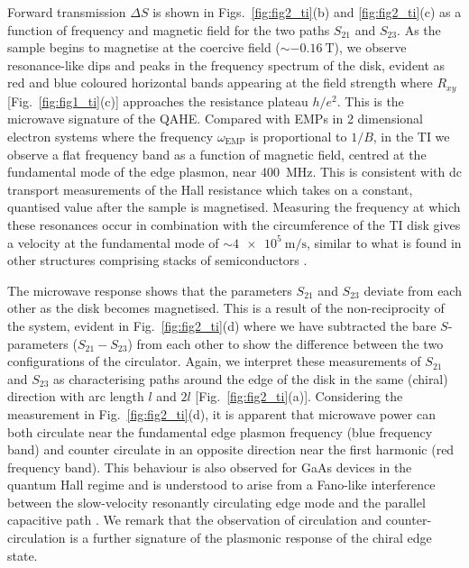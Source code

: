 Forward transmission $\Delta S$ is shown in Figs.~\ref{fig:fig2_ti}(b) and \ref{fig:fig2_ti}(c) as a function of frequency and magnetic field for the two paths $S_{21}$ and $S_{23}$. As the sample begins to magnetise at the coercive field ($\sim \SI{-0.16}{\tesla}$), we observe resonance-like dips and peaks in the frequency spectrum of the disk, evident as red and blue coloured horizontal bands appearing at the field strength where $R_{xy}$ [Fig.~\ref{fig:fig1_ti}(c)] approaches the resistance plateau $h/e^2$. This is the microwave signature of the QAHE. Compared with EMPs in 2 dimensional electron systems \cite{mahoney2016chip} where the frequency $\omega_{\mathrm{EMP}}$ is proportional to $1/B$, in the TI we observe a flat frequency band as a function of magnetic field, centred at  the fundamental mode of the edge plasmon, near \SI{400}{\mega\hertz}. This is consistent with dc transport measurements of the Hall resistance which takes on a constant, quantised value after the sample is magnetised. Measuring the frequency at which these resonances occur in combination with the circumference of the TI disk gives a velocity at the fundamental mode of $\sim \SI{4e5}{\meter\per\second}$, similar to what is found in other structures comprising stacks of semiconductors \cite{kamata2010voltage, kumada2011edge, mahoney2016chip}.

The microwave response shows that  the parameters $S_{21}$ and $S_{23}$ deviate from each other as the disk becomes magnetised. This is a result of the non-reciprocity of the system, evident in Fig.~\ref{fig:fig2_ti}(d) where we have subtracted the bare $S$-parameters ($S_{21} - S_{23}$) from each other to show the difference between the two configurations of the circulator. Again, we interpret these measurements of $S_{21}$ and $S_{23}$ as characterising paths around the edge of the disk in the same (chiral) direction with arc length $l$ and $2l$ [Fig.~\ref{fig:fig2_ti}(a)]. Considering the measurement in Fig.~\ref{fig:fig2_ti}(d), it is apparent that microwave power can both circulate near the fundamental edge plasmon frequency (blue frequency band) and counter circulate in an opposite direction near the first harmonic (red frequency band). This behaviour is also observed for GaAs devices in the quantum Hall regime \cite{mahoney2016chip} and is understood to arise from a Fano-like interference between the slow-velocity resonantly circulating edge mode and the parallel capacitive path \cite{placke2016model}. We remark that the observation of circulation and counter-circulation is a further signature of the plasmonic response of the chiral edge state.


